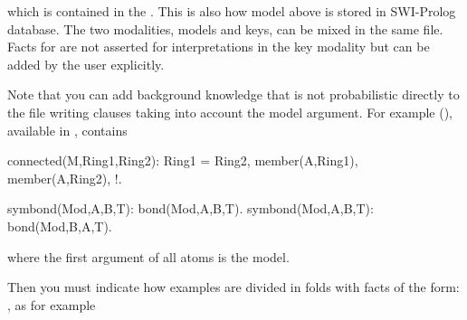 \documentclass[letterpaper,10pt,english]{sphinxmanual}
\begin{document}
\begin{sphinxVerbatim}[commandchars=\\\{\}]
\end{sphinxVerbatim}

which is contained in the .
This is also how model  above is stored in SWI-Prolog database.
The two modalities, models and keys, can be mixed in the same file.
Facts for  are not asserted for interpretations in the key modality but can be added by the user explicitly.

Note that you can add background knowledge that is not probabilistic directly to the file writing clauses taking into account the model argument.
For example (), available in , contains

\begin{sphinxVerbatim}[commandchars=\\\{\}]
connected(\PYGZus{}M,Ring1,Ring2):\PYGZhy{}
        Ring1 \PYGZbs{}= Ring2,
        member(A,Ring1),
        member(A,Ring2), !.

symbond(Mod,A,B,T):\PYGZhy{} bond(Mod,A,B,T).
symbond(Mod,A,B,T):\PYGZhy{} bond(Mod,B,A,T).
\end{sphinxVerbatim}

where the first argument of all atoms is the model.

Then you must indicate how examples are divided in folds with facts of the form: , as for example
\end{document}

